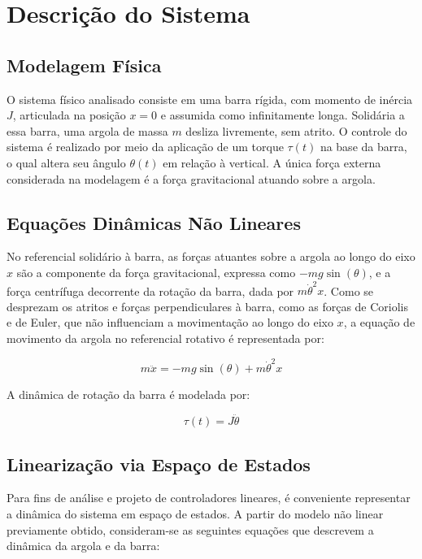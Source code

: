 \documentclass[a4paper, 12pt]{article}
\begin{document}
\section{Descrição do Sistema}

\subsection{Modelagem Física}

O sistema físico analisado consiste em uma barra rígida, com momento de inércia \( J \), articulada na posição \( x = 0 \) e assumida como infinitamente longa. Solidária a essa barra, uma argola de massa \( m \) desliza livremente, sem atrito. O controle do sistema é realizado por meio da aplicação de um torque \( \tau(t) \) na base da barra, o qual altera seu ângulo \( \theta(t) \) em relação à vertical. A única força externa considerada na modelagem é a força gravitacional atuando sobre a argola.

\subsection{Equações Dinâmicas Não Lineares}

No referencial solidário à barra, as forças atuantes sobre a argola ao longo do eixo \( x \) são a componente da força gravitacional, expressa como \( -mg \sin(\theta) \), e a força centrífuga decorrente da rotação da barra, dada por \( m \dot{\theta}^2 x \). Como se desprezam os atritos e forças perpendiculares à barra, como as forças de Coriolis e de Euler, que não influenciam a movimentação ao longo do eixo \( x \), a equação de movimento da argola no referencial rotativo é representada por:

\begin{equation}
    m \ddot{x} = -mg \sin(\theta) + m \dot{\theta}^2 x
\end{equation}

A dinâmica de rotação da barra é modelada por:

\begin{equation}
    \tau(t) = J \ddot{\theta}
\end{equation}

\subsection{Linearização via Espaço de Estados}

Para fins de análise e projeto de controladores lineares, é conveniente representar a dinâmica do sistema em espaço de estados. A partir do modelo não linear previamente obtido, consideram-se as seguintes equações que descrevem a dinâmica da argola e da barra:
\end{document}
